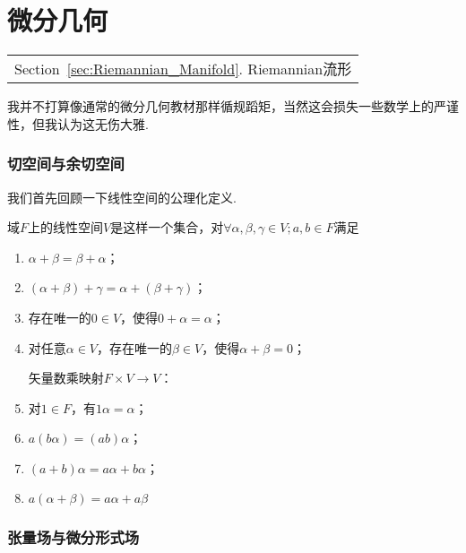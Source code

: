 \part{微分几何}\label{Part:Differential_Geometry}
	\begin{margintable}\vspace{1.4in}\footnotesize
		\begin{tabularx}{\marginparwidth}{|X}
			
			Section~\ref{sec:Riemannian_Manifold}. Riemannian流形\\
			
		\end{tabularx}
	\end{margintable}	
	我并不打算像通常的微分几何教材那样循规蹈矩，当然这会损失一些数学上的严谨性，但我认为这无伤大雅.
	\section{切空间与余切空间}
		我们首先回顾一下线性空间的公理化定义.
		\begin{definition}
			域$F$上的线性空间$V$是这样一个集合，对$\forall \alpha,\beta,\gamma\in V;a,b\in F$满足
			\begin{enumerate}
				矢量加法映射$V\times V\rightarrow V$：
				\item $\alpha+\beta=\beta+\alpha$；
				\item $(\alpha+\beta)+\gamma=\alpha+(\beta+\gamma)$；
				\item 存在唯一的$0\in V$，使得$0+\alpha=\alpha$；
				\item 对任意$\alpha\in V$，存在唯一的$\beta\in V$，使得$\alpha+\beta=0$；
				
				矢量数乘映射$F\times V\rightarrow V$：
				\item 对$1\in F$，有$1\alpha=\alpha$；
				\item $a(b\alpha)=(ab)\alpha$；
				\item $(a+b)\alpha=a\alpha+b\alpha$；
				\item $a(\alpha+\beta)=a\alpha+a\beta$
			\end{enumerate}
		\end{definition}
	
	\section{张量场与微分形式场}


